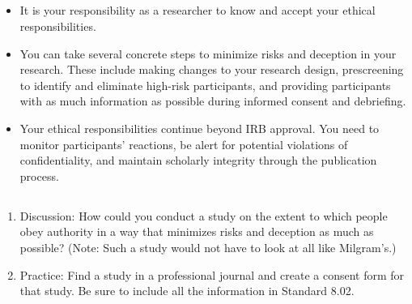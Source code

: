 \subsection{}

\begin{fullwidth}

\begin{itemize}

\item It is your responsibility as a researcher to know and accept your ethical responsibilities.

\item You can take several concrete steps to minimize risks and deception in your research. These
include making changes to your research design, prescreening to identify and eliminate high-risk participants, and providing participants with as much information as possible during informed consent and debriefing.

\item Your ethical responsibilities continue beyond IRB approval. You need to monitor participants' reactions, be alert for potential violations of confidentiality, and maintain scholarly integrity through the publication process.


\end{itemize}

\end{fullwidth}


\subsection{}

\begin{fullwidth}

\begin{enumerate}

\item Discussion: How could you conduct a study on the extent to which people obey authority in a way that minimizes risks and deception as much as possible? (Note: Such a study would not have to look at all like Milgram's.)

\item Practice: Find a study in a professional journal and create a consent form for that study. Be sure to include all the information in Standard 8.02.

\end{enumerate}

\end{fullwidth}  



